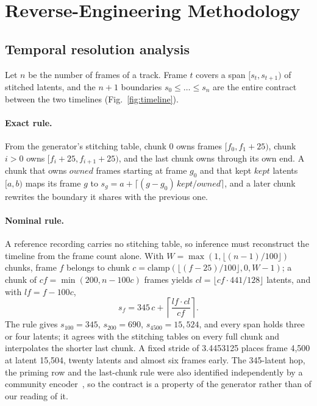 \section{Reverse-Engineering Methodology}
\label{sec:methodology}


\subsection{Temporal resolution analysis}
\label{sec:timeline}

Let $n$ be the number of frames of a track. Frame $t$ covers a span $[s_t, s_{t+1})$ of stitched latents, and the $n+1$ boundaries $s_0 \le \dots \le s_n$ are the entire contract between the two timelines (Fig.~\ref{fig:timeline}).

\paragraph{Exact rule.} From the generator's stitching table, chunk 0 owns frames $[f_0, f_1 + 25)$, chunk $i > 0$ owns $[f_i + 25, f_{i+1} + 25)$, and the last chunk owns through its own end. A chunk that owns $\mathit{owned}$ frames starting at frame $g_0$ and that kept $\mathit{kept}$ latents $[a, b)$ maps its frame $g$ to $s_g = a + \lceil (g - g_0)\,\mathit{kept} / \mathit{owned} \rceil$, and a later chunk rewrites the boundary it shares with the previous one.

\paragraph{Nominal rule.} A reference recording carries no stitching table, so inference must reconstruct the timeline from the frame count alone. With $W = \max(1, \lfloor (n-1)/100 \rfloor)$ chunks, frame $f$ belongs to chunk $c = \mathrm{clamp}(\lfloor (f-25)/100 \rfloor, 0, W-1)$; a chunk of $cf = \min(200, n - 100c)$ frames yields $cl = \lfloor cf \cdot 441/128 \rfloor$ latents, and with $lf = f - 100c$,
\begin{equation}
  s_f = 345\,c + \left\lceil \frac{lf \cdot cl}{cf} \right\rceil .
  \label{eq:nominal}
\end{equation}
The rule gives $s_{100} = 345$, $s_{200} = 690$, $s_{4500} = 15{,}524$, and every span holds three or four latents; it agrees with the stitching tables on every full chunk and interpolates the shorter last chunk. A fixed stride of 3.4453125 places frame 4,500 at latent 15,504, twenty latents and almost six frames early. The 345-latent hop, the priming row and the last-chunk rule were also identified independently by a community encoder~\cite{serveurperso2026encoder}, so the contract is a property of the generator rather than of our reading of it.

